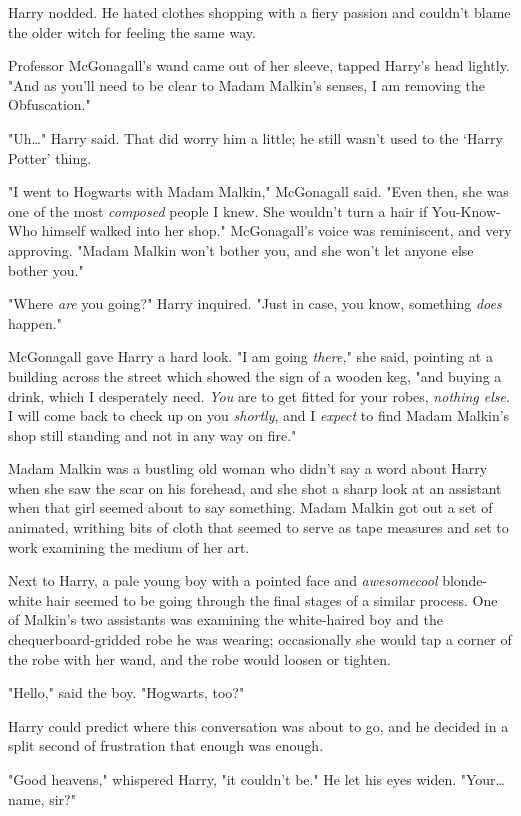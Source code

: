Harry nodded. He hated clothes shopping with a fiery passion and couldn't blame 
the older witch for feeling the same way.

Professor McGonagall's wand came out of her sleeve, tapped Harry's head 
lightly. "And as you'll need to be clear to Madam Malkin's senses, I am 
removing the Obfuscation."

"Uh{\ldots}" Harry said. That did worry him a little; he still wasn't used to 
the `Harry Potter' thing.

"I went to Hogwarts with Madam Malkin," McGonagall said. "Even then, she was 
one of the most \emph{composed} people I knew. She wouldn't turn a hair if 
You-Know-Who himself walked into her shop." McGonagall's voice was reminiscent, 
and very approving. "Madam Malkin won't bother you, and she won't let anyone 
else bother you."

"Where \emph{are} you going?" Harry inquired. "Just in case, you know, 
something \emph{does} happen."

McGonagall gave Harry a hard look. "I am going \emph{there,}" she said, 
pointing at a building across the street which showed the sign of a wooden keg, 
"and buying a drink, which I desperately need. \emph{You} are to get fitted for 
your robes, \emph{nothing else}. I will come back to check up on you 
\emph{shortly}, and I \emph{expect} to find Madam Malkin's shop still standing 
and not in any way on fire."

Madam Malkin was a bustling old woman who didn't say a word about Harry when 
she saw the scar on his forehead, and she shot a sharp look at an assistant 
when that girl seemed about to say something. Madam Malkin got out a set of 
animated, writhing bits of cloth that seemed to serve as tape measures and set 
to work examining the medium of her art.

Next to Harry, a pale young boy with a pointed face and \emph{awesomecool} 
blonde-white hair seemed to be going through the final stages of a similar 
process. One of Malkin's two assistants was examining the white-haired boy and 
the chequerboard-gridded robe he was wearing; occasionally she would tap a 
corner of the robe with her wand, and the robe would loosen or tighten.

"Hello," said the boy. "Hogwarts, too?"

Harry could predict where this conversation was about to go, and he decided in 
a split second of frustration that enough was enough.

"Good heavens," whispered Harry, "it couldn't be." He let his eyes widen. 
"Your{\ldots} name, sir?"

